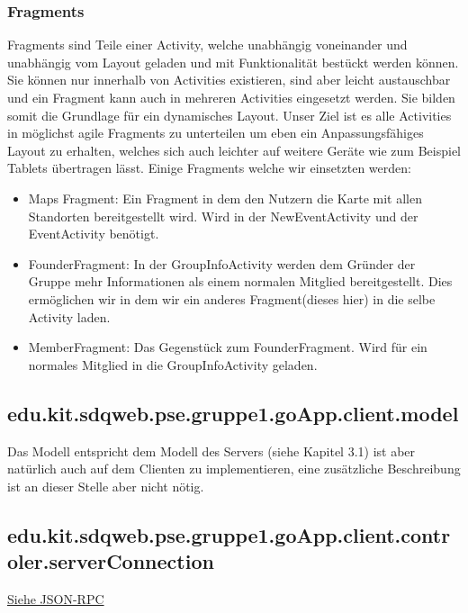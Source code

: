	 \subsubsection{Fragments}
	 Fragments sind Teile einer Activity, welche unabhängig voneinander und unabhängig vom Layout geladen und mit Funktionalität bestückt werden können.  
	 Sie können nur innerhalb von Activities existieren, sind aber leicht austauschbar und ein Fragment kann auch in mehreren Activities eingesetzt werden. 
	 Sie bilden somit die Grundlage für ein dynamisches Layout. \newline
	 Unser Ziel ist es alle Activities in möglichst agile Fragments zu unterteilen um eben ein Anpassungsfähiges Layout zu erhalten, welches sich auch leichter auf weitere Geräte wie zum Beispiel Tablets übertragen lässt.
	 \newline Einige Fragments welche wir einsetzten werden:
	 \begin{itemize}
	 \item Maps Fragment: Ein Fragment in dem den Nutzern die Karte mit allen Standorten bereitgestellt wird. Wird in der NewEventActivity und der EventActivity benötigt.
	 \item FounderFragment: In der GroupInfoActivity werden dem Gründer der Gruppe mehr Informationen als einem normalen Mitglied bereitgestellt. Dies ermöglichen wir in dem wir ein anderes Fragment(dieses hier) in die selbe Activity laden.
	 \item MemberFragment: Das Gegenstück zum FounderFragment. Wird für ein normales Mitglied in die GroupInfoActivity geladen.
	 \end{itemize}
	 
	
	\subsection{edu.kit.sdqweb.pse.gruppe1.goApp.client.model}
	Das Modell entspricht dem Modell des Servers (siehe Kapitel 3.1) ist aber natürlich auch auf dem Clienten zu implementieren, eine zusätzliche Beschreibung ist an dieser Stelle aber nicht nötig.
	
	\subsection{edu.kit.sdqweb.pse.gruppe1.goApp.client.controler.serverConnection}
	\hyperlink{ServerConnection}{Siehe JSON-RPC}